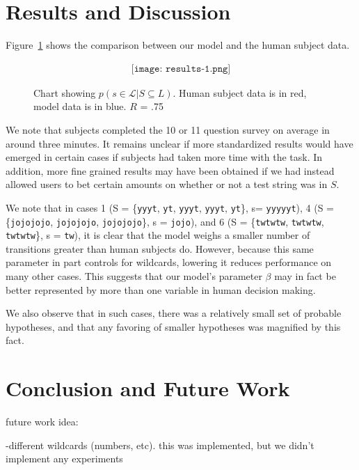 \documentclass[10pt,letterpaper]{article}
\begin{document}
\section{Results and Discussion}
Figure~\ref{results-chart} shows the comparison between our model and the human subject data.

\begin{figure}[ht]
\begin{center}
\begin{align*}
\texttt{[image: results-1.png]}
\end{align*}
\end{center}
\caption{Chart showing  $p(s \in \mathcal{L} | S \subseteq {L}) $. Human subject data is in red, model data is in blue. $R$ = .75} 
\label{results-chart}
\end{figure} 

We note that subjects completed the 10 or 11 question survey on average in around three minutes. It remains unclear if more standardized results would have emerged in certain cases if subjects had taken more time with the task. In addition, more fine grained results may have been obtained if we had instead allowed users to bet certain amounts on whether or not a test string was in $S$. 

We note that in cases 1 (S = \{\verb!yyyt!, \verb!yt!, \verb!yyyt!, \verb!yyyt!, \verb!yt!\}, s= \verb!yyyyyt!), 4 (S = \{\verb!jojojojo!, \verb!jojojojo!, \verb!jojojojo!\}, s = \verb!jojo!), and 6 (S = \{\verb!twtwtw!, \verb!twtwtw!, \verb!twtwtw!\}, s =  \verb!tw!), it is clear that the model weighs a smaller number of transitions greater than human subjects do. However, because this same parameter in part controls for wildcards, lowering it reduces performance on many other cases. This suggests that our model's parameter $\beta$ may in fact be better represented by more than one variable in human decision making. 

We also observe that in such cases, there was a relatively small set of probable hypotheses, and that any favoring of smaller hypotheses was magnified by this fact. 
\section{Conclusion and Future Work}
future work idea:

-different wildcards (numbers, etc). this was implemented, but we didn't implement any experiments

\end{document}
